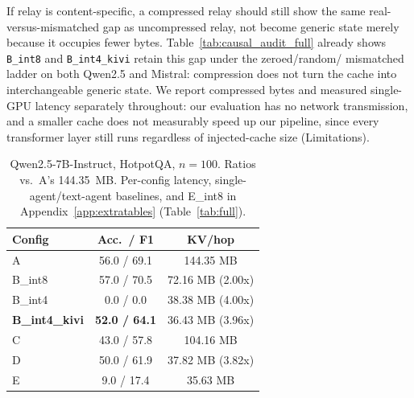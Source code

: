 \documentclass[11pt]{article}
\begin{document}
If relay is content-specific, a compressed relay should still show the
same real-versus-mismatched gap as uncompressed relay, not become
generic state merely because it occupies fewer bytes.
Table~\ref{tab:causal_audit_full} already shows \texttt{B\_int8} and
\texttt{B\_int4\_kivi} retain this gap under the zeroed/random/
mismatched ladder on both Qwen2.5 and Mistral: compression does not
turn the cache into interchangeable generic state. We report
compressed bytes and measured single-GPU latency separately
throughout: our evaluation has no network transmission, and a smaller
cache does not measurably speed up our pipeline, since every
transformer layer still runs regardless of injected-cache size
(Limitations).

\begin{table}[t]
\centering
\small
\begin{tabular}{lcc}
\toprule
\textbf{Config} & \textbf{Acc.\ / F1} & \textbf{KV/hop} \\
\midrule
A & 56.0 / 69.1 & 144.35 MB \\
B\_int8 & 57.0 / 70.5 & 72.16 MB (2.00x) \\
B\_int4 & 0.0 / 0.0 & 38.38 MB (4.00x) \\
\textbf{B\_int4\_kivi} & \textbf{52.0 / 64.1} & 36.43 MB (3.96x) \\
C & 43.0 / 57.8 & 104.16 MB \\
D & 50.0 / 61.9 & 37.82 MB (3.82x) \\
E & 9.0 / 17.4 & 35.63 MB \\
\bottomrule
\end{tabular}
\caption{Qwen2.5-7B-Instruct, HotpotQA, $n=100$. Ratios vs.\ A's
144.35~MB. Per-config latency, single-agent/text-agent baselines, and
E\_int8 in Appendix~\ref{app:extratables} (Table~\ref{tab:full}).}
\label{tab:main}
\end{table}
\end{document}
